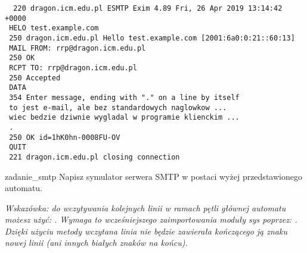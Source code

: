 \documentclass{pdfBooklets}
\begin{document}
{\vspace{0.3cm}\noindent\tt
   \hspace{1cm}\color{xgreen}220 dragon.icm.edu.pl ESMTP Exim 4.89 Fri, 26 Apr 2019 13:14:42 +0000
\\ \hspace{1cm}\color{blue}HELO test.example.com
\\ \hspace{1cm}\color{xgreen}250 dragon.icm.edu.pl Hello test.example.com [2001:6a0:0:21::60:13]
\\ \hspace{1cm}\color{blue}MAIL FROM: rrp@dragon.icm.edu.pl
\\ \hspace{1cm}\color{xgreen}250 OK
\\ \hspace{1cm}\color{blue}RCPT TO: rrp@dragon.icm.edu.pl
\\ \hspace{1cm}\color{xgreen}250 Accepted
\\ \hspace{1cm}\color{blue}DATA
\\ \hspace{1cm}\color{xgreen}354 Enter message, ending with "." on a line by itself
\\ \hspace{1cm}\color{blue}to jest e-mail, ale bez standardowych naglowkow ...
\\ \hspace{1cm}\color{blue}wiec bedzie dziwnie wygladal w programie klienckim ...
\\ \hspace{1cm}\color{blue}.
\\ \hspace{1cm}\color{xgreen}250 OK id=1hK0hn-0008FU-OV
\\ \hspace{1cm}\color{blue}QUIT
\\ \hspace{1cm}\color{xgreen}221 dragon.icm.edu.pl closing connection
\color{black}\vspace{0.3cm}}

\begin{Zadanie}{}{zadanie_smtp}
Napisz symulator serwera SMTP w postaci wyżej przedstawionego automatu.

\vspace{0.3cm}
\emph{Wskazówka: do wczytywania kolejnych linii w ramach pętli głównej automatu możesz użyć: .
                 Wymaga to wcześniejszego zaimportowania moduły sys poprzez: .\student{\\}
                 Dzięki użyciu metody  wczytana linia nie będzie zawierała kończącego ją znaku nowej linii (ani innych białych znaków na końcu).
}
\end{Zadanie}
\end{document}
